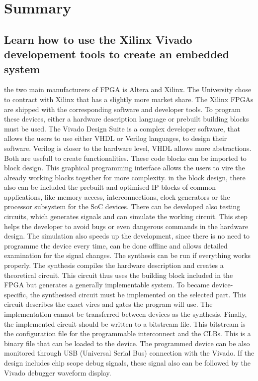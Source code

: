 \chapter{Summary} \label{ch:sum} %

\section{Learn how to use the Xilinx Vivado developement tools to create an embedded system} %
the two main manufacturers of FPGA is Altera and Xilinx.
The University chose to contract with Xilinx that has a slightly more market share.
The Xilinx FPGAs are shipped with the corresponding software and developer tools.
To program these devices, either a hardware description language or prebuilt building blocks must be used.
The Vivado Design Suite is a complex developer software, that allows the users to use either VHDL or Verilog languages, to design their software.
Verilog is closer to the hardware level, VHDL allows more abstractions.
Both are usefull to create functionalities.
These code blocks can be imported to block design.
This graphical programming interface allows the users to vire the already working blocks together for more complexity.
in the block design, there also can be included the prebuilt and optimised IP blocks of common applications, like memory access, interconnections, clock generators or the processor subsystem for the SoC devices.
There can be developed also testing circuits, which generates signals and can simulate the working circuit.
This step helps the developer to avoid bugs or even dangerous commands in the hardware design.
The simulation also speeds up the development, since there is no need to programme the device every time, can be done offline and allows detailed examination for the signal changes.
The synthesis can be run if everything works properly.
The synthesis compiles the hardware description and creates a theoretical circuit.
This circuit thus uses the building block included in the FPGA but generates a generally implementable system.
To became device-specific, the synthesised circuit must be implemented on the selected part.
This circuit describes the exact vires and gates the program will use.
The implementation cannot be transferred between devices as the synthesis.
Finally, the implemented circuit should be written to a bitstream file.
This bitstream is the configuration file for the programmable interconnect and the CLBs.
This is a binary file that can be loaded to the device.
The programmed device can be also monitored through USB (Universal Serial Bus) connection with the Vivado.
If the design includes chip scope debug signals, these signal also can be followed by the Vivado debugger waveform display.

